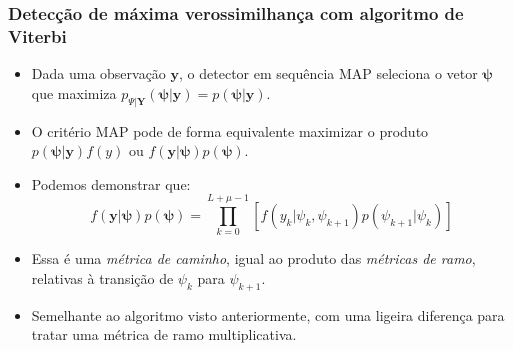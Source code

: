 \begin{frame}
	\frametitle{Detecção de máxima verossimilhança com algoritmo de Viterbi}

	\begin{itemize}
	    \item Dada uma observação $\mathbf{y}$, o detector em sequência MAP seleciona o vetor $\boldsymbol{\psi}$ que maximiza $p_{\Psi | \mathbf{Y}}(\boldsymbol{\psi}|\mathbf{y}) = p(\boldsymbol{\psi}|\mathbf{y})$.
	    \item O critério MAP pode de forma equivalente maximizar o produto $p(\boldsymbol{\psi}|\mathbf{y})f(y)$ ou $f(\mathbf{y}|\boldsymbol{\psi})p(\boldsymbol{\psi})$.
	    \item Podemos demonstrar que:
	    \begin{equation*}
		f(\mathbf{y}|\boldsymbol{\psi})p(\boldsymbol{\psi}) = \prod_{k=0}^{L+\mu-1} \left[ f(y_k|\psi_k , \psi_{k+1})p(\psi_{k+1}|\psi_k) \right]
	    \end{equation*}
	    \item Essa é uma \textit{métrica de caminho}, igual ao produto das \textit{métricas de ramo}, relativas à transição de $\psi_k$ para $\psi_{k+1}$.
	    \item Semelhante ao algoritmo visto anteriormente, com uma ligeira diferença para tratar uma métrica de ramo multiplicativa.
	\end{itemize}			
\end{frame}


